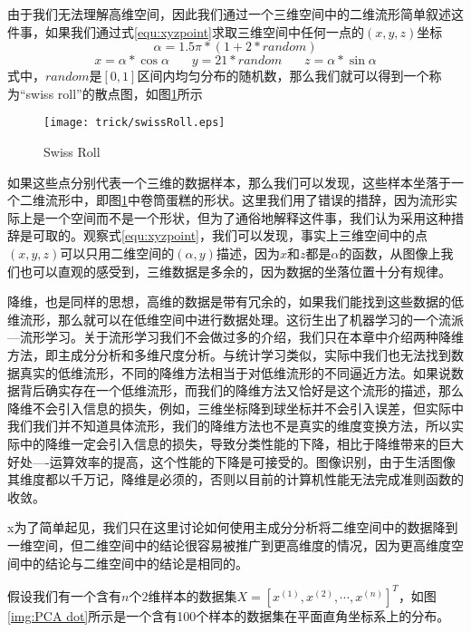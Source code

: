 由于我们无法理解高维空间，因此我们通过一个三维空间中的二维流形简单叙述这件事，如果我们通过式\eqref{equ:xyzpoint}求取三维空间中任何一点的$(x, y, z)$坐标
\begin{equation}
\alpha = 1.5\pi *(1+2 * random)
\end{equation}
\begin{equation}
x = \alpha * \cos\alpha~~~~~~~~y = 21 * random~~~~~~~~z = \alpha * \sin\alpha
\label{equ:xyzpoint}
\end{equation}
式中，$random$是$[0,1]$区间内均匀分布的随机数，那么我们就可以得到一个称为“swiss roll”的散点图，如图\ref{img:swiss roll}所示
\begin{figure}[!htbp]
\centering
\texttt{[image: trick/swissRoll.eps]}
\caption{Swiss Roll}
\label{img:swiss roll}
\end{figure}
如果这些点分别代表一个三维的数据样本，那么我们可以发现，这些样本坐落于一个二维流形中，即图\ref{img:swiss roll}中卷筒蛋糕的形状。这里我们用了错误的措辞，因为流形实际上是一个空间而不是一个形状，但为了通俗地解释这件事，我们认为采用这种措辞是可取的。观察式\eqref{equ:xyzpoint}，我们可以发现，事实上三维空间中的点$(x,y,z)$可以只用二维空间的$(\alpha, y)$描述，因为$x$和$z$都是$\alpha$的函数，从图像上我们也可以直观的感受到，三维数据是多余的，因为数据的坐落位置十分有规律。

降维，也是同样的思想，高维的数据是带有冗余的，如果我们能找到这些数据的低维流形，那么就可以在低维空间中进行数据处理。这衍生出了机器学习的一个流派---流形学习。关于流形学习我们不会做过多的介绍，我们只在本章中介绍两种降维方法，即主成分分析和多维尺度分析。与统计学习类似，实际中我们也无法找到数据真实的低维流形，不同的降维方法相当于对低维流形的不同逼近方法。如果说数据背后确实存在一个低维流形，而我们的降维方法又恰好是这个流形的描述，那么降维不会引入信息的损失，例如，三维坐标降到球坐标并不会引入误差，但实际中我们我们并不知道具体流形，我们的降维方法也不是真实的维度变换方法，所以实际中的降维一定会引入信息的损失，导致分类性能的下降，相比于降维带来的巨大好处----运算效率的提高，这个性能的下降是可接受的。图像识别，由于生活图像其维度都以千万记，降维是必须的，否则以目前的计算机性能无法完成准则函数的收敛。

x为了简单起见，我们只在这里讨论如何使用主成分分析将二维空间中的数据降到一维空间，但二维空间中的结论很容易被推广到更高维度的情况，因为更高维度空间中的结论与二维空间中的结论是相同的。

假设我们有一个含有$n$个$2$维样本的数据集$X = [x^{(1)}, x^{(2)}, \cdots, x^{(n)}]^T$，如图\ref{img:PCA dot}所示是一个含有100个样本的数据集在平面直角坐标系上的分布。

